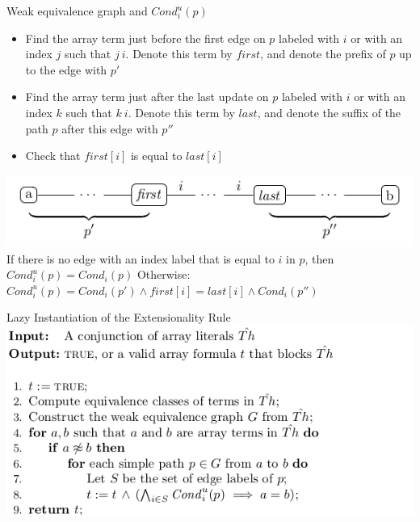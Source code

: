 \documentclass{beamer}
\begin{document}
\begin{frame}{Weak equivalence graph and $Cond_{i}^{u}(p)$}
\begin{itemize}
\item Find the array term just before the first edge on $p$ labeled with $i$ or with an index $j$ such that $j ~ i$. Denote this term by $first$, and denote the prefix of $p$ up to the edge with $p'$
\item Find the array term just after the last update on $p$ labeled with $i$ or with an index $k$ such that $k ~ i$. Denote this term by $last$, and denote the suffix of the path $p$ after this edge with $p''$
\item Check that $first[i]$ is equal to $last[i]$
\end{itemize}
\includegraphics[scale=0.5]{graph2.png}\newline
If there is no edge with an index label that is equal to $i$ in $p$, then $Cond_{i}^{u}(p) = Cond_i(p)$\newline
Otherwise: $Cond_{i}^{u}(p) = Cond_i(p') \wedge first[i] = last[i] \wedge Cond_i(p'')$
\end{frame}

\begin{frame}{Lazy Instantiation of the Extensionality Rule}
\includegraphics[scale=0.5]{extensional-array-encoding.png}\newline
\end{frame}
\end{document}
